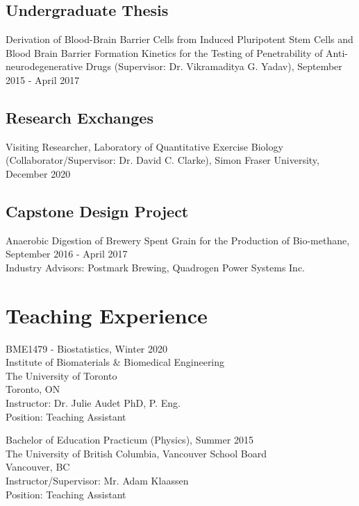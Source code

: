 \documentclass[letterpaper]{article}
\renewenvironment{itemize}{
  \begin{list}{}{
    \setlength{\leftmargin}{1.5em}
  }
}{
  \end{list}
}
\begin{document}
\subsection*{Undergraduate Thesis}

\begin{itemize}
\item Derivation of Blood-Brain Barrier Cells from Induced Pluripotent Stem Cells and Blood Brain Barrier Formation Kinetics for the Testing of Penetrability of Anti-neurodegenerative Drugs (Supervisor: Dr. Vikramaditya G. Yadav), September 2015 - April 2017 
\end{itemize}

\subsection*{Research Exchanges}
\begin{itemize}
\item Visiting Researcher, Laboratory of Quantitative Exercise Biology (Collaborator/Supervisor: Dr. David C. Clarke), Simon Fraser University, December 2020 
\end{itemize}

\subsection*{Capstone Design Project}

\begin{itemize}
\item Anaerobic Digestion of Brewery Spent Grain for the Production of Bio-methane, September 2016 - April 2017
\\ Industry Advisors: Postmark Brewing, Quadrogen Power Systems Inc.
\end{itemize}

\section*{\textbf{Teaching Experience}}
\begin{itemize}
    \item BME1479 - Biostatistics, Winter 2020
    \\Institute of Biomaterials \& Biomedical Engineering
    \\The University  of Toronto
    \\Toronto, ON
    \\Instructor: Dr. Julie Audet PhD, P. Eng.
    \\Position: Teaching Assistant
    \item Bachelor of Education Practicum (Physics), Summer 2015
    \\ The University of British Columbia, Vancouver School Board
    \\ Vancouver, BC
    \\ Instructor/Supervisor: Mr. Adam Klaassen
    \\ Position: Teaching Assistant
\end{itemize}
\end{document}

